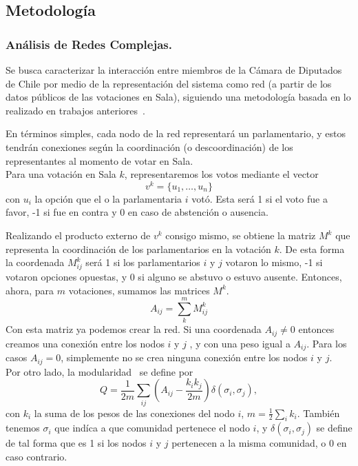 \documentclass{proyectotesis}
\begin{document}
\subsection{Metodología}
\subsubsection{Análisis de Redes Complejas.}
Se busca caracterizar la interacción entre miembros de la Cámara de Diputados de Chile por medio de la representación del sistema como red (a partir de los datos públicos de las votaciones en Sala), siguiendo una metodología basada en lo realizado en trabajos anteriores~\cite{andris_rise_2015, marenco_time_2020, schoch_legislators_2020, intal_dissent_2021}. 

En términos simples, cada nodo de la red representará un parlamentario, y estos tendrán conexiones según la coordinación (o descoordinación) de los representantes al momento de votar en Sala.\\

Para una votación en Sala $k$, representaremos los votos mediante el vector 
\begin{equation}
    v^k = \{u_1,\dots,u_n\}
\end{equation}
con $u_i$ la opción que el o la parlamentaria $i$ votó. Esta será 1 si el voto fue a favor, -1 si fue en contra y 0 en caso de abstención o ausencia.

Realizando el producto externo de $v^k$ consigo mismo, se obtiene la matriz $M^k$ que representa la coordinación de los parlamentarios en la votación $k$. De esta forma la coordenada $M^k_{ij}$ será 1 si los parlamentarios $i$ y $j$ votaron lo mismo, -1 si votaron opciones opuestas, y 0 si alguno se abstuvo o estuvo ausente. Entonces, ahora, para $m$ votaciones, sumamos las matrices $M^k$.
\begin{equation}
    A_{ij} = \sum_k^m M^k_{ij} \label{adj}
\end{equation}
Con esta matriz ya podemos crear la red. Si una coordenada $A_{ij}\neq 0$ entonces creamos una conexión entre los nodos $i$ y $j$ , y con una peso igual a $A_{ij}$. Para los casos $A_{ij} = 0$, simplemente no se crea ninguna conexión entre los nodos $i$ y $j$.\\

Por otro lado, la modularidad~\cite{newman_finding_2004} se define por
\begin{equation}
    Q = \frac{1}{2m}\sum_{ij} \left( A_{ij} - \frac{k_i k_j}{2m}  \right) \delta(\sigma_i,\sigma_j) \label{mod}
,\end{equation}
con $k_i$ la suma de los pesos de las conexiones del nodo $i$, $m = \frac{1}{2} \sum_i k_i$. También tenemos $\sigma_i$ que indíca a que comunidad pertenece el nodo $i$, y $\delta(\sigma_i,\sigma_j)$ se define de tal forma que es 1 si los nodos $i$ y $j$ pertenecen a la misma comunidad, o 0 en caso contrario.\\
\end{document}
